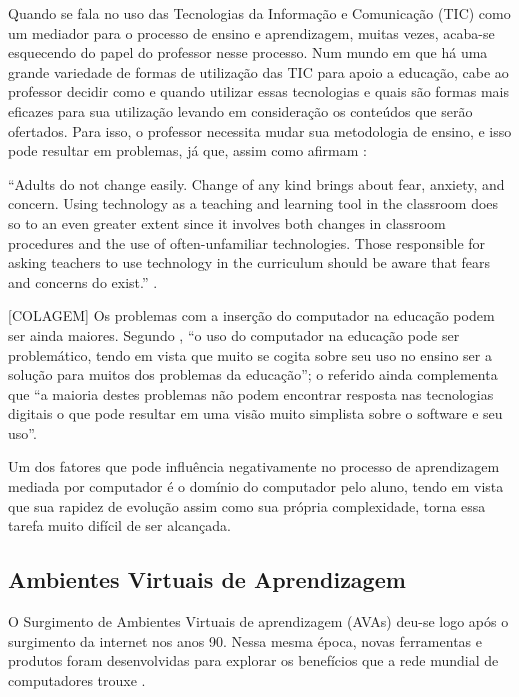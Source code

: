 Quando se fala no uso das Tecnologias da Informação e Comunicação (TIC) como um mediador para o processo de ensino e aprendizagem, muitas vezes, acaba-se esquecendo do papel do professor nesse 
processo. Num mundo em que há uma grande variedade de formas de utilização das TIC para apoio a educação, cabe ao professor decidir como e quando utilizar essas tecnologias e quais s\~ao formas 
mais eficazes para sua utilização levando em consideração os conteúdos que serão ofertados. Para isso, o professor necessita mudar sua metodologia de ensino, e isso pode resultar em problemas, já 
que, assim como afirmam :

\begin{citacao}
``Adults do not change easily. Change of any kind brings about fear, anxiety, and concern. Using technology as a teaching and learning tool in the classroom does so to an even greater extent since it involves both changes in classroom procedures and the use of often-unfamiliar technologies. Those responsible for asking teachers to use technology in the curriculum should be aware that fears and concerns do exist.'' \cite{bitner2002integrating}.
\end{citacao}

[COLAGEM]
Os problemas com a inserção do computador na educação podem ser ainda maiores. Segundo , ``o uso do computador na educação pode ser problemático, tendo em vista que muito se cogita sobre seu uso no ensino ser a solução para muitos dos problemas da educação''; o referido ainda complementa que ``a maioria destes problemas não podem encontrar resposta nas tecnologias digitais o que pode resultar em uma visão muito simplista sobre o software e seu uso''.

Um dos fatores que pode influência negativamente no processo de aprendizagem mediada por computador é o domínio do computador pelo aluno, tendo em vista que sua rapidez de evolução assim como sua própria complexidade, torna essa tarefa muito difícil de ser alcançada.



\subsection{Ambientes Virtuais de Aprendizagem}

O Surgimento de Ambientes Virtuais de aprendizagem (AVAs) deu-se logo após o surgimento da internet nos anos 90. Nessa mesma época, novas ferramentas e produtos foram desenvolvidas para explorar os benefícios que a rede mundial de computadores trouxe \cite{oleary2002virtual}.

